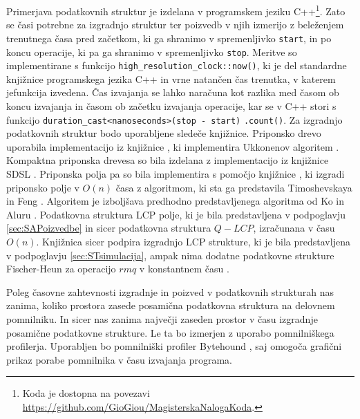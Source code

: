 Primerjava podatkovnih struktur je izdelana v programskem jeziku C++\footnote{Koda je dostopna na povezavi \url{https://github.com/GioGiou/MagisterskaNalogaKoda}.}. Zato se časi potrebne za izgradnjo struktur ter poizvedb v njih izmerijo z beleženjem trenutnega časa pred začetkom, ki ga shranimo v spremenljivko \verb|start|, in po koncu operacije, ki pa ga shranimo v spremenljivko \verb|stop|. Meritve so implementirane s funkcijo \verb|high_resolution_clock::now()|, ki je del standardne knjižnice programskega jezika C++ in vrne natančen čas trenutka, v katerem jefunkcija izvedena. Čas izvajanja se lahko naračuna kot razlika med časom ob koncu izvajanja in časom ob začetku izvajanja operacije, kar se v C++ stori s funkcijo \verb|duration_cast<nanoseconds>(stop - start)| \verb|.count()|. Za izgradnjo podatkovnih struktur bodo uporabljene sledeče knjižnice. Priponsko drevo uporabila implementacijo iz knjižnice \cite{ganeshk13}, ki implementira Ukkonenov algoritem \cite{Ukkonen1995}. Kompaktna priponska drevesa so bila izdelana z implementacijo iz knjižnice SDSL \cite{gbmp2014sea}. Priponska polja pa so bila implementira s pomočjo knjižnice \cite{Grebnov2025}, ki izgradi priponsko polje v $O(n)$ časa z algoritmom, ki sta ga predstavila Timoshevskaya in Feng \cite{Timoshevskaya2014}. Algoritem je izboljšava predhodno predstavljenega algoritma od Ko in Aluru \cite{Ko2005}. Podatkovna struktura LCP polje, ki je bila predstavljena v podpoglavju \ref{sec:SAPoizvedbe} in sicer podatkovna struktura $Q-LCP$, izračunana v času $O(n)$. Knjižnica \cite{Grebnov2025} sicer podpira izgradnjo LCP strukture, ki je bila predstavljena v podpoglavju \ref{sec:STsimulacija}, ampak nima dodatne podatkovne strukture Fischer-Heun za operacijo $rmq$ v konstantnem času \cite{Fischer2007}.

Poleg časovne zahtevnosti izgradnje in poizved v podatkovnih strukturah nas zanima, koliko prostora zasede posamična podatkovna struktura  na delovnem pomnilniku. In sicer nas zanima največji zaseden prostor v času izgradnje posamične podatkovne strukture. Le ta bo izmerjen z uporabo pomnilniškega profilerja. Uporabljen bo pomnilniški profiler Bytehound \cite{Bytehound2024}, saj omogoča grafični prikaz porabe pomnilnika v času izvajanja programa.

